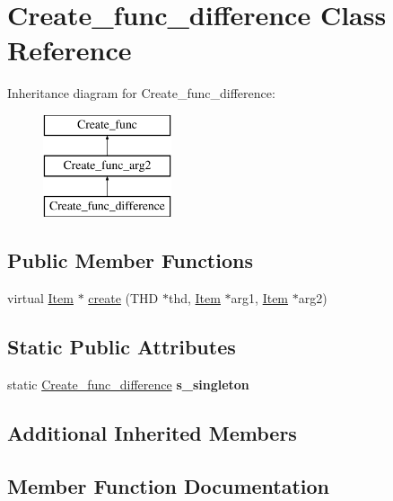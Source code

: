 \hypertarget{classCreate__func__difference}{}\section{Create\+\_\+func\+\_\+difference Class Reference}
\label{classCreate__func__difference}
Inheritance diagram for Create\+\_\+func\+\_\+difference\+:\begin{figure}[H]
\begin{center}
\leavevmode
\includegraphics[height=3.000000cm]{classCreate__func__difference}
\end{center}
\end{figure}
\subsection*{Public Member Functions}
\begin{DoxyCompactItemize}
\item 
virtual \mbox{\hyperlink{classItem}{Item}} $\ast$ \mbox{\hyperlink{classCreate__func__difference_a1f706c6e52265eda20badff3ec866db5}{create}} (T\+HD $\ast$thd, \mbox{\hyperlink{classItem}{Item}} $\ast$arg1, \mbox{\hyperlink{classItem}{Item}} $\ast$arg2)
\end{DoxyCompactItemize}
\subsection*{Static Public Attributes}
\begin{DoxyCompactItemize}
\item 
\mbox{\label{classCreate__func__difference_a797e6cf2e5a7c5af97c128e634045abe}} 
static \mbox{\hyperlink{classCreate__func__difference}{Create\+\_\+func\+\_\+difference}} {\bfseries s\+\_\+singleton}
\end{DoxyCompactItemize}
\subsection*{Additional Inherited Members}


\subsection{Member Function Documentation}
\mbox{\label{classCreate__func__difference_a1f706c6e52265eda20badff3ec866db5}} 
